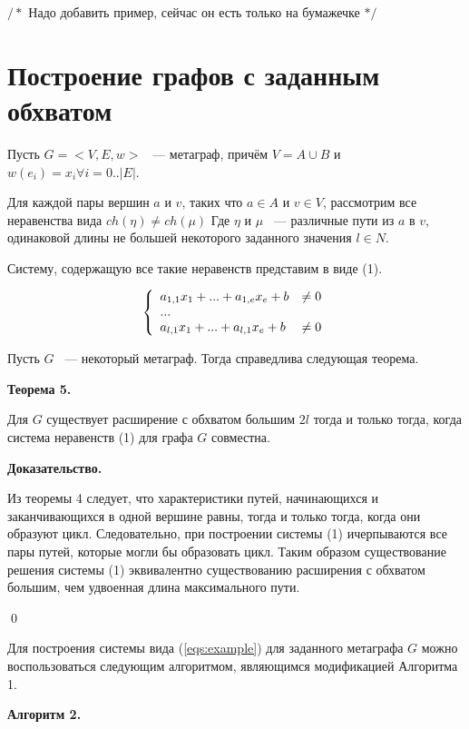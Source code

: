 \documentclass[14pt]{mmcs-article}
\begin{document}
$/*$ Надо добавить пример, сейчас он есть только на бумажечке $*/$

\pagebreak
\section*{Построение графов с заданным обхватом}

Пусть $G = <V, E, w>$ ~--- метаграф, причём $V = A \cup B$ и $w(e_i) = x_i \forall i = 0..|E|$.

Для каждой пары вершин $a$ и $v$, таких что $a \in A$ и $v \in V$, рассмотрим все неравенства вида $ch(\eta) \neq ch(\mu)$ Где $\eta$ и $\mu$ ~--- различные пути из $a$ в $v$, одинаковой длины не большей некоторого заданного значения $l \in N$.

Систему, содержащую все такие неравенств представим в виде (1).

\begin{equation}
    \centering
    \left\{
        \begin{array}{ll}
            a_{1,1} x_1 + ... + a_{1,e} x_e + b &\neq 0\\
            ...\\
            a_{l,1} x_1 + ... + a_{l,1} x_e + b &\neq 0\\
        \end{array}
    \right.
    \label{eqs:example}
\end{equation}

Пусть $G$ ~--- некоторый метаграф. Тогда справедлива следующая теорема.

\textbf{Теорема 5.}

Для $G$ существует расширение с обхватом большим $2l$  тогда и только тогда, когда система неравенств (1) для графа $G$ совместна.

\textbf{Доказательство.}

Из теоремы 4 следует, что характеристики путей, начинающихся и заканчивающихся в одной вершине равны, тогда и только тогда, когда они образуют цикл. Следовательно, при построении системы (1) ичерпываются все пары путей, которые могли бы образовать цикл. Таким образом существование решения системы (1) эквивалентно существованию расширения с обхватом большим, чем удвоенная длина максимального пути.

\qed

Для построения системы вида (\ref{eqs:example}) для заданного метаграфа $G$ можно воспользоваться следующим алгоритмом, являющимся модификацией Алгоритма 1.

\textbf{Алгоритм 2.}
\end{document}
